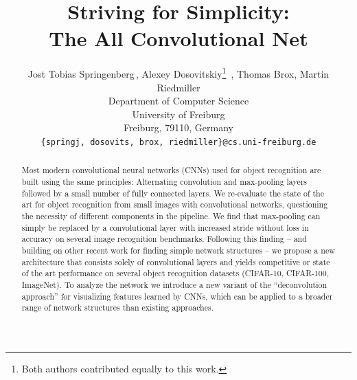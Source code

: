 \documentclass{article} %
\title{Striving for Simplicity: \\ The All Convolutional Net}
\author{
Jost Tobias Springenberg\footnotemark[1] \,, Alexey
Dosovitskiy\thanks{Both authors contributed equally to this work.}\, , Thomas Brox, Martin Riedmiller \\
Department of Computer Science\\
University of Freiburg\\
Freiburg, 79110, Germany \\
\texttt{\{springj, dosovits, brox, riedmiller\}@cs.uni-freiburg.de} \\
}
\newcommand{\TODO}[1]{[TODO #1]}
\begin{document}
\maketitle

\begin{abstract}
Most modern convolutional neural networks (CNNs) used for
object recognition are built using the same principles: Alternating convolution and max-pooling
layers followed by a small number of fully connected layers.
We re-evaluate the state of the art for object recognition from small
images with convolutional networks, questioning the necessity of
different components in the pipeline. We find that
max-pooling can simply be replaced by a convolutional layer with increased stride
without loss in accuracy on several image recognition
benchmarks. Following this finding -- and building on other recent work
for finding simple network structures -- we propose a new
architecture that consists solely of convolutional layers and yields
competitive or state of the art performance on several object recognition datasets (CIFAR-10, CIFAR-100, ImageNet). 
To analyze the network we introduce a new variant of the ``deconvolution approach'' for visualizing features learned by CNNs, which can be applied to a broader range of network structures than existing approaches. 
\end{abstract}
\end{document}
